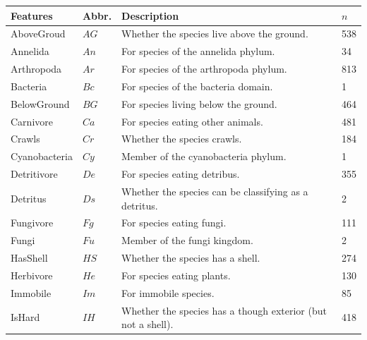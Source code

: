 \documentclass[letterpaper]{article}
\begin{document}
\begin{table}
  \centering
  \begin{tabular}{|llll|}
    \hline
    Features          & Abbr. & Description                                                       & $n$ \\
    \hline
    \hline
    AboveGroud        & $AG$   & Whether the species live above the ground.                       & 538 \\
    Annelida          & $An$   & For species of the annelida phylum.                              & 34 \\
    Arthropoda        & $Ar$   & For species of the arthropoda phylum.                            & 813 \\
    Bacteria          & $Bc$   & For species of the bacteria domain.                              & 1 \\
    BelowGround       & $BG$   & For species living below the ground.                             & 464 \\
    Carnivore         & $Ca$   & For species eating other animals.                                & 481 \\
    Crawls            & $Cr$   & Whether the species crawls.                                      & 184 \\
    Cyanobacteria     & $Cy$   & Member of the cyanobacteria phylum.                              & 1 \\
    Detritivore       & $De$   & For species eating detribus.                                     & 355 \\
    Detritus          & $Ds$   & Whether the species can be classifying as a detritus.            & 2 \\
    Fungivore         & $Fg$   & For species eating fungi.                                        & 111 \\
    Fungi             & $Fu$   & Member of the fungi kingdom.                                     & 2 \\
    HasShell          & $HS$   & Whether the species has a shell.                                 & 274 \\
    Herbivore         & $He$   & For species eating plants.                                       & 130 \\
    Immobile          & $Im$   & For immobile species.                                            & 85 \\
    IsHard            & $IH$   & Whether the species has a though exterior (but not a shell).     & 418 \\

\end{tabular}
\end{table}
\end{document}
